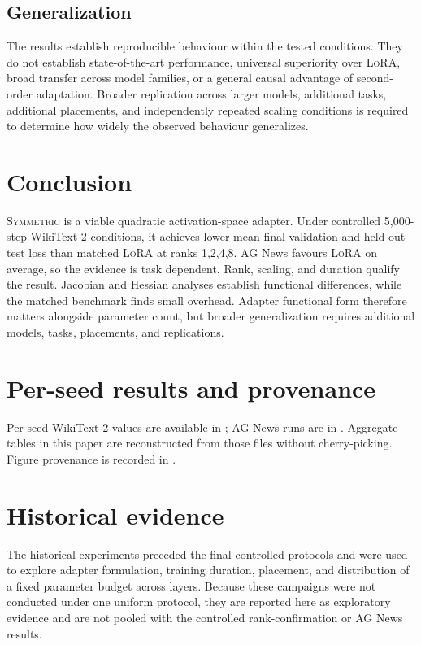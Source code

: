 \documentclass[11pt]{article}
\newcommand{\sym}{\textsc{Symmetric}}\newcommand{\lora}{\textsc{LoRA}}
\begin{document}
\subsection{Generalization}
The results establish reproducible behaviour within the tested conditions. They do not establish state-of-the-art performance, universal superiority over \lora{}, broad transfer across model families, or a general causal advantage of second-order adaptation. Broader replication across larger models, additional tasks, additional placements, and independently repeated scaling conditions is required to determine how widely the observed behaviour generalizes.

\section{Conclusion}
\sym{} is a viable quadratic activation-space adapter. Under controlled 5,000-step WikiText-2 conditions, it achieves lower mean final validation and held-out test loss than matched \lora{} at ranks 1,2,4,8. AG News favours \lora{} on average, so the evidence is task dependent. Rank, scaling, and duration qualify the result. Jacobian and Hessian analyses establish functional differences, while the matched benchmark finds small overhead. Adapter functional form therefore matters alongside parameter count, but broader generalization requires additional models, tasks, placements, and replications.

\appendix
\section{Per-seed results and provenance}
Per-seed WikiText-2 values are available in ; AG News runs are in . Aggregate tables in this paper are reconstructed from those files without cherry-picking. Figure provenance is recorded in .

\section{Historical evidence}\label{app:history}
The historical experiments preceded the final controlled protocols and were used to explore adapter formulation, training duration, placement, and distribution of a fixed parameter budget across layers. Because these campaigns were not conducted under one uniform protocol, they are reported here as exploratory evidence and are not pooled with the controlled rank-confirmation or AG News results.
\end{document}
